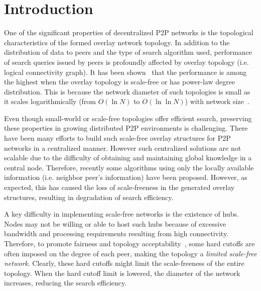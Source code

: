 \documentclass[10pt,journal,cspaper,compsoc]{IEEEtran}
\begin{document}
\maketitle


\IEEEdisplaynotcompsoctitleabstractindextext


\IEEEpeerreviewmaketitle



\section{Introduction}
\label{sec:intro}

One of the significant properties of decentralized P2P networks is the topological characteristics of the formed overlay network topology. 
In addition to the distribution of data to peers and the type of search algorithm used, performance of search queries issued by peers is profoundly affected by overlay topology (i.e. logical connectivity graph). 
It has been shown~\cite{hui} that the performance is among the highest when the overlay topology is scale-free or has power-law degree distribution. This is because the network diameter of such topologies is small as it scales logarithmically (from $O(\ln N)$ to $O(\ln \ln N)$) with network size~\cite{ultra-small}.

Even though small-world or scale-free topologies offer efficient search, 
preserving these properties in growing distributed P2P environments is challenging. 
There have been many efforts to build such scale-free overlay structures for P2P networks in a centralized manner. However such centralized solutions are not scalable due to the difficulty of obtaining and maintaining global knowledge in a central node. 
Therefore, recently some algorithms using only the locally available information (i.e. neighbor peer's information) have been proposed. 
However, as expected, this has caused the loss of scale-freeness in the generated overlay structures, resulting in degradation of search efficiency.

A key difficulty in implementing scale-free networks is the existence of hubs. Nodes may not be willing or able to host such hubs because of excessive bandwidth and processing requirements resulting from high connectivity.  
Therefore, to promote fairness and topology acceptability~\cite{guclu}, some hard cutoffs are often imposed on the degree of each peer, making the topology a {\it limited scale-free network}. Clearly, these hard cutoffs might limit the scale-freeness of the entire topology. When the hard cutoff limit is lowered, the diameter of the network increases, reducing the search efficiency.
\end{document}
